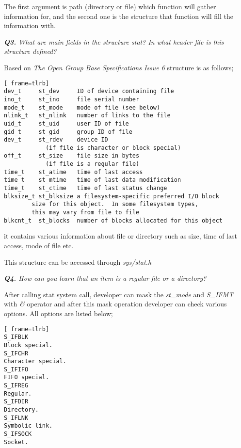 \documentclass[11pt]{article}
\begin{document}
The first argument is path (directory or file) which function will gather information for, and the second one is the structure that function will fill the information with.

\vspace{5mm}
\textit{\textbf{Q3.} What are main fields in the structure stat? In what header file is this structure defined?}
\vspace{5mm}

Based on \textit{The Open Group Base Specifications Issue 6} structure is as follows;

\vspace{5mm}
\begin{minipage}{1\textwidth}
\begin{lstlisting}[ frame=tlrb]
dev_t     st_dev     ID of device containing file
ino_t     st_ino     file serial number
mode_t    st_mode    mode of file (see below)
nlink_t   st_nlink   number of links to the file
uid_t     st_uid     user ID of file
gid_t     st_gid     group ID of file
dev_t     st_rdev    device ID 
			(if file is character or block special)
off_t     st_size    file size in bytes 
			(if file is a regular file)
time_t    st_atime   time of last access
time_t    st_mtime   time of last data modification
time_t    st_ctime   time of last status change
blksize_t st_blksize a filesystem-specific preferred I/O block 
		size for this object.  In some filesystem types,
		this may vary from file to file
blkcnt_t  st_blocks  number of blocks allocated for this object
\end{lstlisting}
\end{minipage}

it contains various information about file or directory such as size, time of last access, mode of file etc.

This structure can be accessed through \textit{sys/stat.h}

\vspace{5mm}
\textit{\textbf{Q4.} How can you learn that an item is a regular file or a directory?}
\vspace{5mm}

After calling stat system call, developer can mask the \textit{st\_mode} and \textit{S\_IFMT} with \textit{\&} operator and after this mask operation developer can check various options. All options are listed below;

\vspace{5mm}
\begin{minipage}{1\textwidth}
\begin{lstlisting}[ frame=tlrb]
S_IFBLK
Block special.
S_IFCHR
Character special.
S_IFIFO
FIFO special.
S_IFREG
Regular.
S_IFDIR
Directory.
S_IFLNK
Symbolic link.
S_IFSOCK
Socket. 
\end{lstlisting}
\end{minipage}
\end{document}
